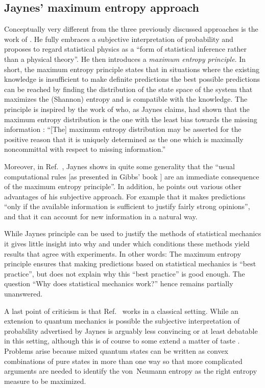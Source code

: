 \documentclass[a4paper,12pt,listof=totoc,index=totoc,bibliography=totoc,headsepline=false,headings=normal,BCOR16.153846mm,DIV12,headinclude,twoside,cleardoublepage=empty,numbers=noenddot,final]{scrreprt}
\theoremstyle{mystyle}
\numberwithin{equation}{section}
\numberwithin{figure}{section}
\numberwithin{lemma}{section}
\numberwithin{theorem}{section}
\numberwithin{corollary}{section}
\numberwithin{definition}{section}
\numberwithin{conjecture}{section}
\numberwithin{observation}{section}
\newcommand{\+}{\mkern2mu}
\DeclareMathOperator{\1}{\mathds{1}}
\begin{document}
\subsection{Jaynes' maximum entropy approach}
\label{sec:jaynesmaximumentropyapproach}
%
Conceptually very different from the three previously discussed approaches is the work of \textcite{Jaynes}.
He fully embraces a subjective interpretation of probability and proposes to regard statistical physics as a ``form of statistical inference rather than a physical theory''.
He then introduces a \emph{maximum entropy principle}.
In short, the maximum entropy principle states that in situations where the existing knowledge is insufficient to make definite predictions the best possible predictions can be reached by finding the distribution of the state space of the system that maximizes the (Shannon) entropy and is compatible with the knowledge.
The principle is inspired by the work of \textcite{Shannon1949} who, as Jaynes claims, had shown that the maximum entropy distribution is the one with the least bias towards the missing information \cite{Jaynes}: ``[The] maximum entropy distribution may be asserted for the positive reason that it is uniquely determined as the one which is maximally noncommittal with respect to missing information.''

Moreover, in Ref.~\cite{Jaynes}, Jaynes shows in quite some generality that the ``usual computational rules [as presented in Gibbs' book \cite{Gibbs1902}] are an immediate consequence of the maximum entropy principle''.
In addition, he points out various other advantages of his subjective approach.
For example that it makes predictions ``only if the available information is sufficient to justify fairly strong opinions'', and that it can account for new information in a natural way.

While Jaynes principle can be used to justify the methods of statistical mechanics it gives little insight into why and under which conditions these methods yield results that agree with experiments.
In other words: The maximum entropy principle ensures that making predictions based on statistical mechanics is ``best practice'', but does not explain why this ``best practice'' is good enough. 
The question ``Why does statistical mechanics work?'' hence remains partially unanswered.

A last point of criticism is that Ref.~\cite{Jaynes} works in a classical setting.
While an extension to quantum mechanics is possible \cite{PhysRev.108.17} the subjective interpretation of probability advertised by Jaynes is arguably less convincing or at least debatable in this setting, although this is of course to some extend a matter of taste \cite{Fuchs,Timpson2008}.
Problems arise because mixed quantum states can be written as convex combinations of pure states in more than one way so that more complicated arguments are needed to identify the von~Neumann entropy as the right entropy measure to be maximized.
\end{document}
